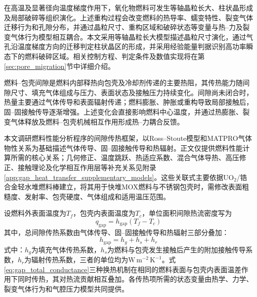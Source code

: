 
在高温及显著径向温度梯度作用下，氧化物燃料可发生等轴晶粒长大、柱状晶形成及局部破碎等组织演化。上述重构过程会改变燃料的热导率、蠕变特性、裂变气体迁移行为和孔隙分布，并通过晶粒尺寸、重构区域和破碎状态等变量与热--力及裂变气体行为模型相互耦合。本文采用等轴晶粒长大模型描述晶粒尺寸演化，通过气孔沿温度梯度方向的迁移判定柱状晶区的形成，并采用经验能量判据识别高功率瞬态下的燃料破碎区域。相关控制方程、判定条件及数值实现将在第\ref{sec:pore_migration}节中详细介绍。

\label{sec:gap_heat_transfer_model}

燃料--包壳间隙是燃料内部释热向包壳及冷却剂传递的主要热阻，其传热能力随间隙尺寸、填充气体组成与压力、表面状态及接触压力持续变化。间隙尚未闭合时，热量主要通过气体传导和表面辐射传递；燃料膨胀、肿胀或重构导致局部接触后，固--固接触传导逐渐增强。上述变化会直接影响燃料中心温度，并通过热膨胀、裂变气体释放及燃料--包壳机械相互作用形成热--力耦合反馈。

本文调研燃料性能分析程序的间隙传热框架，以Ross--Stoute模型和MATPRO气体物性关系为基础描述气体传导、固--固接触传导和热辐射\cite{halesBISONTheoryManual2016,rossHEATTRANSFERCOEFFICIENT1962,hagrmanSCDAPRELAP5MOD1995}。正文仅提供燃料性能计算所需的核心关系；几何修正、温度跳跃、热适应系数、混合气体导热、高压修正、接触理论及化学相互作用层等补充关系见附录\ref{app:gap_heat_transfer_supplementary_models}。这些关联式主要依据$\mathrm{UO}_2$/锆合金轻水堆燃料棒建立，将其用于快堆MOX燃料与不锈钢包壳时，需修改表面粗糙度、发射率、包壳硬度、气体组成和适用温压范围。


设燃料外表面温度为$T_f$，包壳内表面温度为$T_c$，单位面积间隙热流密度写为
\begin{equation}
	q_{\mathrm{gap}}
	=h_{\mathrm{gap}}\left(T_f-T_c\right)
	\label{eq:gap_heat_flux}
\end{equation}
其中，总间隙传热系数由气体传导、固--固接触传导和热辐射三部分叠加：
\begin{equation}
	h_{\mathrm{gap}}=h_g+h_s+h_r
	\label{eq:gap_total_conductance}
\end{equation}
式中：$h_g$为填充气体传热系数，$h_s$为燃料与包壳发生接触后产生的附加接触传导系数，$h_r$为辐射传热系数，三者的单位均为$\mathrm{W\,m^{-2}\,K^{-1}}$。式\eqref{eq:gap_total_conductance}三种换热机制在相同的燃料表面与包壳内表面温差作用下同时传热，其对热流贡献相互叠加。各传热项所需的状态变量由热学、力学、裂变气体行为和气腔压力模型共同提供。

